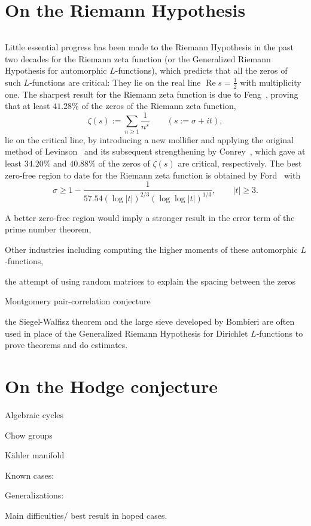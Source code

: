 \newpage
\section{On the Riemann Hypothesis}
$ $ 

Little essential progress has been made to the Riemann Hypothesis in the past two decades for the Riemann zeta function (or the Generalized Riemann Hypothesis for automorphic $L$-functions), which predicts that all the zeros of such $L$-functions are critical: They lie on the real line $\operatorname{Re}s=\tfrac{1}{2}$ with multiplicity one.  The sharpest result for the Riemann zeta function is due to Feng~\cite{Fe2012}, proving that at least $41.28\%$ of the zeros of the Riemann zeta function,
\[
\zeta(s):=\sum_{n\ge 1} \frac{1}{n^s}\qquad (s:=\sigma+it),
\]
lie on the critical line, by introducing a new mollifier and applying the original method of Levinson~\cite{Le1974} and its subsequent strengthening by Conrey~\cite{Co1989}, which gave at least $34.20\%$ and $40.88\%$ of the zeros of $\zeta(s)$ are critical, respectively. The best zero-free region to date for the Riemann zeta function is obtained by Ford~\cite{Fo2002} with
\[
\sigma \ge 1-\frac{1}{57.54(\log|t|)^{2/3}(\log\log|t|)^{1/3}},\qquad |t|\ge 3.
\] 

A better zero-free region would imply a stronger result in the error term of the prime number theorem, 

Other industries including computing the higher moments of these automorphic $L$-functions, 

the attempt of using random matrices to explain the spacing between the zeros  

Montgomery pair-correlation conjecture

the Siegel-Walfisz theorem and the large sieve developed by Bombieri are often used in place of the Generalized Riemann Hypothesis for Dirichlet $L$-functions to prove theorems and do estimates.

\newpage
\section{On the Hodge conjecture}
Algebraic cycles

Chow groups

K\"ahler manifold

Known cases:

Generalizations:

Main difficulties/ best result in hoped cases.


